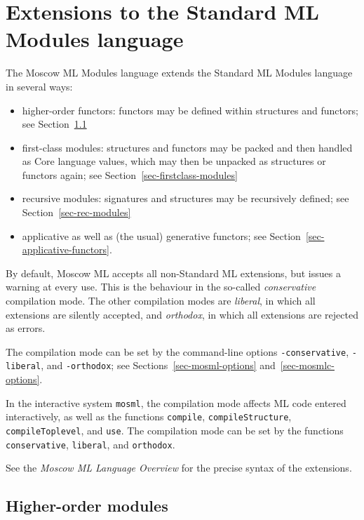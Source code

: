\documentclass[fleqn,a4paper]{article}
\begin{document}
\newpage
\section{Extensions to the Standard ML Modules language}
\label{sec-modules-extensions}

The Moscow ML Modules language extends the Standard ML Modules
language in several ways:

\begin{itemize}
\item higher-order functors: functors may be defined within
  structures and functors; see Section~\ref{sec-ho-modules}
\item first-class modules: structures and functors may be packed and
  then handled as Core language values, which may then be unpacked as
  structures or functors again; see
  Section~\ref{sec-firstclass-modules}
\item recursive modules: signatures and structures may be recursively
  defined; see Section~\ref{sec-rec-modules}
\item applicative as well as (the usual) generative functors; see
  Section~\ref{sec-applicative-functors}.
\end{itemize}

\noindent 
By default, Moscow ML accepts all non-Standard ML extensions, but
issues a warning at every use.  This is the behaviour in the so-called
\emph{conservative} compilation mode.  The other compilation modes are
\emph{liberal}, in which all extensions are silently accepted, and
\emph{orthodox}, in which all extensions are rejected as errors.

The compilation mode can be set by the command-line options
\texttt{-conservative}, \texttt{-liberal}, and \texttt{-orthodox}; see
Sections~\ref{sec-mosml-options} and~\ref{sec-mosmlc-options}.

In the interactive system \texttt{mosml}, the compilation mode affects
ML code entered interactively, as well as the functions
\texttt{compile}, \texttt{compileStructure}, \texttt{compileToplevel},
and \texttt{use}.  The compilation mode can be set by the functions
\texttt{conservative}, \texttt{liberal}, and \texttt{orthodox}.

See the \emph{Moscow ML Language Overview} for the precise syntax of
the extensions.


\subsection{Higher-order modules}
\label{sec-ho-modules}
\end{document}
